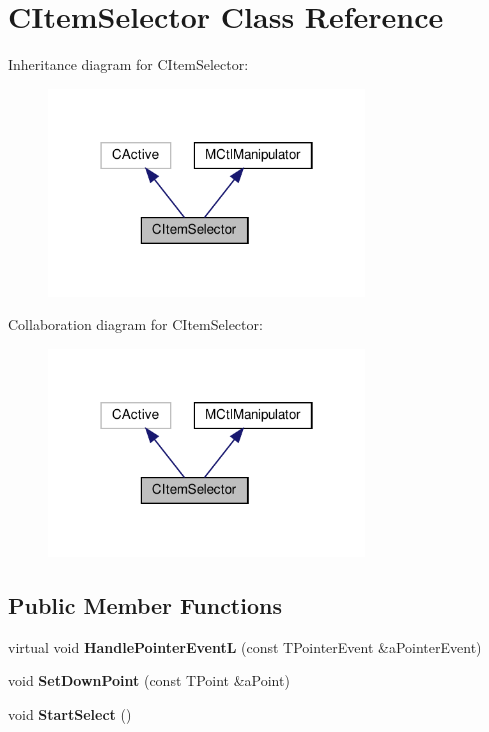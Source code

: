 \hypertarget{classCItemSelector}{}\section{C\+Item\+Selector Class Reference}
\label{classCItemSelector}


Inheritance diagram for C\+Item\+Selector\+:
\nopagebreak
\begin{figure}[H]
\begin{center}
\leavevmode
\includegraphics[width=238pt]{classCItemSelector__inherit__graph}
\end{center}
\end{figure}


Collaboration diagram for C\+Item\+Selector\+:
\nopagebreak
\begin{figure}[H]
\begin{center}
\leavevmode
\includegraphics[width=238pt]{classCItemSelector__coll__graph}
\end{center}
\end{figure}
\subsection*{Public Member Functions}
\begin{DoxyCompactItemize}
\item 
\mbox{\label{classCItemSelector_ae3397bf2fe1e3fcb641762ea3b78891b}} 
virtual void {\bfseries Handle\+Pointer\+EventL} (const T\+Pointer\+Event \&a\+Pointer\+Event)
\item 
\mbox{\label{classCItemSelector_ae7ca505480c8c242821116877eb760c3}} 
void {\bfseries Set\+Down\+Point} (const T\+Point \&a\+Point)
\item 
\mbox{\label{classCItemSelector_a2241a27681ede476cf7fa1444a07a99d}} 
void {\bfseries Start\+Select} ()
\end{DoxyCompactItemize}
